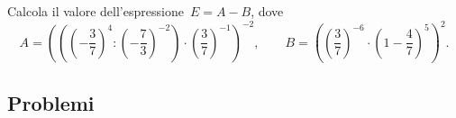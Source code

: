 % 
% 
% 

\begin{esercizio}
\label{ese:3.165}
Calcola il valore dell'espressione~\(E = A- B\), dove
\[A=\left(\left(\left(-{\frac{3}{7}}\right)^{4}:
\left(-{\frac{7}{3}}\right)^{-2}\right)\cdot%
\left(\frac{3}{7}\right)^{-1}\right)^{-2},\qquad
B=\left(\left(\frac{3}{7}\right)^{-6}\cdot%
\left(1-\frac{4}{7}\right)^{5}\right)^{2}.\]
\end{esercizio}


\subsection{Problemi}

